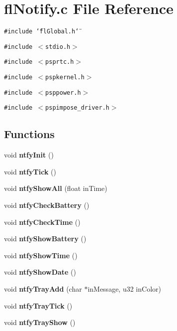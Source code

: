 \section{fl\-Notify.c File Reference}
\label{flNotify_8c}
{\tt \#include \char`\"{}fl\-Global.h\char`\"{}}\par
{\tt \#include $<$stdio.h$>$}\par
{\tt \#include $<$psprtc.h$>$}\par
{\tt \#include $<$pspkernel.h$>$}\par
{\tt \#include $<$psppower.h$>$}\par
{\tt \#include $<$pspimpose\_\-driver.h$>$}\par
\subsection*{Functions}
\begin{CompactItemize}
\item 
void {\bf ntfy\-Init} ()
\item 
void {\bf ntfy\-Tick} ()
\item 
void {\bf ntfy\-Show\-All} (float in\-Time)
\item 
void {\bf ntfy\-Check\-Battery} ()
\item 
void {\bf ntfy\-Check\-Time} ()
\item 
void {\bf ntfy\-Show\-Battery} ()
\item 
void {\bf ntfy\-Show\-Time} ()
\item 
void {\bf ntfy\-Show\-Date} ()
\item 
void {\bf ntfy\-Tray\-Add} (char $\ast$in\-Message, u32 in\-Color)
\item 
void {\bf ntfy\-Tray\-Tick} ()
\item 
void {\bf ntfy\-Tray\-Show} ()
\end{CompactItemize}
